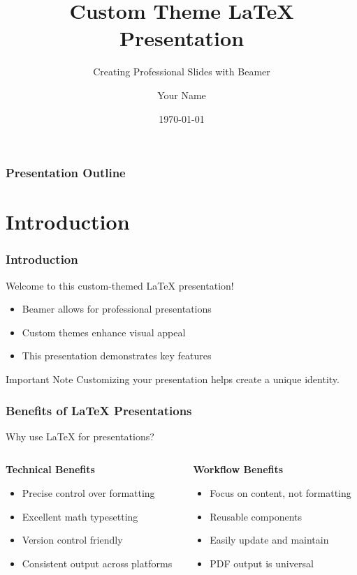 \documentclass{beamer}
\title{Custom Theme LaTeX Presentation}
\subtitle{Creating Professional Slides with Beamer}
\author{Your Name}
\institute{Your Institution}
\date{\today}
\begin{document}
\begin{frame}[plain]
  \titlepage
\end{frame}

\begin{frame}
  \frametitle{Presentation Outline}
  \tableofcontents
\end{frame}

\section{Introduction}

\begin{frame}
  \frametitle{Introduction}
  
  Welcome to this custom-themed \LaTeX{} presentation!
  
  \begin{itemize}
    \item Beamer allows for professional presentations
    \item Custom themes enhance visual appeal
    \item This presentation demonstrates key features
  \end{itemize}
  
  \begin{alertblock}{Important Note}
    Customizing your presentation helps create a unique identity.
  \end{alertblock}
\end{frame}

\begin{frame}
  \frametitle{Benefits of \LaTeX{} Presentations}
  
  Why use \LaTeX{} for presentations?
  
  \begin{columns}
    \begin{column}{0.5\textwidth}
      \textbf{Technical Benefits}
      \begin{itemize}
        \item Precise control over formatting
        \item Excellent math typesetting
        \item Version control friendly
        \item Consistent output across platforms
      \end{itemize}
    \end{column}
    
    \begin{column}{0.5\textwidth}
      \textbf{Workflow Benefits}
      \begin{itemize}
        \item Focus on content, not formatting
        \item Reusable components
        \item Easily update and maintain
        \item PDF output is universal
      \end{itemize}
    \end{column}
  \end{columns}
\end{frame}
\end{document}
